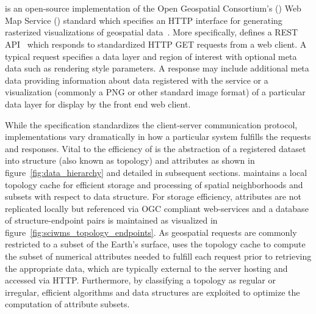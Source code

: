 \section{\sciwms{}}
\label{sec:sciwms}
\Sciwms{} is an open-source implementation of the Open Geospatial
Consortium's (\ogc{}) Web Map Service (\wms{}) standard which
specifies an HTTP interface for generating rasterized visualizations
of geospatial data~\cite{wms14}. More specifically, \wms{} defines a
REST API~\cite{Fielding02} which responds to standardized HTTP GET requests from a
web client. A typical \wms{} request specifies a data layer and region
of interest with optional meta data such as rendering style
parameters. A \wms{} response may include additional meta data
providing information about data registered with the service or a
visualization (commonly a PNG or other standard image format) of a
particular data layer for display by the front end web client.


While the \ogc{} \wms{} specification standardizes the client-server
communication protocol, \wms{} implementations vary dramatically in
how a particular system fulfills the \wms{} requests and
responses. Vital to the efficiency of \sciwms{} is the abstraction of
a registered dataset into structure (also known as topology) and
attributes as shown in figure~\ref{fig:data_hierarchy} and detailed in
subsequent sections. \Sciwms{} maintains a local topology cache for
efficient storage and processing of spatial neighborhoods and subsets
with respect to data structure. For storage efficiency, attributes are
not replicated locally but referenced via OGC compliant web-services
and a database of structure-endpoint pairs is maintained as visualized
in figure~\ref{fig:sciwms_topology_endpoints}. As geospatial
\wms{} requests are commonly restricted to a subset of the Earth's
surface, \sciwms{} uses the topology cache to compute the subset of
numerical attributes needed to fulfill each request prior to
retrieving the appropriate data, which are typically external to
the server hosting \sciwms{} and accessed via HTTP. Furthermore, by
classifying a topology as regular or irregular, efficient algorithms
and data structures are exploited to optimize the computation of
attribute subsets.

